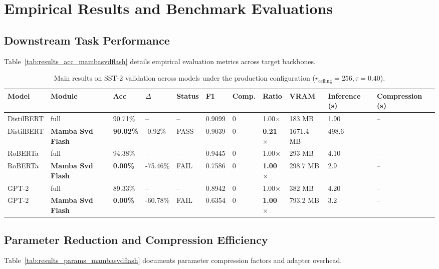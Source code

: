 \section{Empirical Results and Benchmark Evaluations}

\subsection{Downstream Task Performance}
Table~\ref{tab:results_acc_mambasvdflash} details empirical evaluation metrics across target backbones.

\begin{table}[t]
\centering
\small
\begin{tabular}{lllllllllll}
\toprule
\textbf{Model} & \textbf{Module} & \textbf{Acc} & \textbf{$\Delta$} & \textbf{Status} & \textbf{F1} & \textbf{Comp.} & \textbf{Ratio} & \textbf{VRAM} & \textbf{Inference (s)} & \textbf{Compression (s)} \\
\midrule
DistilBERT & full & 90.71\% & -- & -- & 0.9099 & 0 & 1.00$\times$ & 183 MB & 1.90 & -- \\
DistilBERT & \textbf{Mamba Svd Flash} & \textbf{90.02\%} & -0.92\% & PASS & 0.9039 & 0 & \textbf{0.21$\times$} & 1671.4 MB & 498.6 & -- \\
RoBERTa & full & 94.38\% & -- & -- & 0.9445 & 0 & 1.00$\times$ & 293 MB & 4.10 & -- \\
RoBERTa & \textbf{Mamba Svd Flash} & \textbf{0.00\%} & -75.46\% & FAIL & 0.7586 & 0 & \textbf{1.00$\times$} & 298.7 MB & 2.9 & -- \\
GPT-2 & full & 89.33\% & -- & -- & 0.8942 & 0 & 1.00$\times$ & 382 MB & 4.20 & -- \\
GPT-2 & \textbf{Mamba Svd Flash} & \textbf{0.00\%} & -60.78\% & FAIL & 0.6354 & 0 & \textbf{1.00$\times$} & 793.2 MB & 3.2 & -- \\
\bottomrule
\end{tabular}
\caption{Main results on SST-2 validation across models under the production configuration ($r_{\mathrm{ceiling}}=256, \tau=0.40$).}
\label{tab:main_sst2}
\end{table}

\subsection{Parameter Reduction and Compression Efficiency}
Table~\ref{tab:results_params_mambasvdflash} documents parameter compression factors and adapter overhead.

